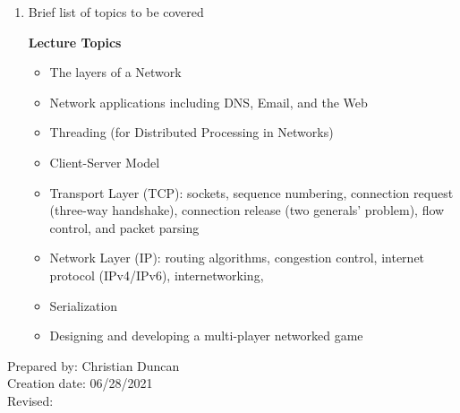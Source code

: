 \begin{enumerate}[1.]
\item Brief list of topics to be covered\\
  {\bfseries
    Lecture Topics
    \begin{itemize}
    \item The layers of a Network
    \item Network applications including DNS, Email, and the Web
    \item Threading (for Distributed Processing in Networks)
    \item Client-Server Model
    \item Transport Layer (TCP): sockets, sequence numbering, connection request (three-way handshake), connection release (two generals' problem), flow control, and packet parsing
    \item Network Layer (IP): routing algorithms, congestion control, internet protocol (IPv4/IPv6), internetworking,
    \item Serialization
    \item Designing and developing a multi-player networked game 
    \end{itemize}
  }
\end{enumerate}

\noindent Prepared by: Christian Duncan\\
\noindent Creation date: 06/28/2021\\
\noindent Revised:\\
